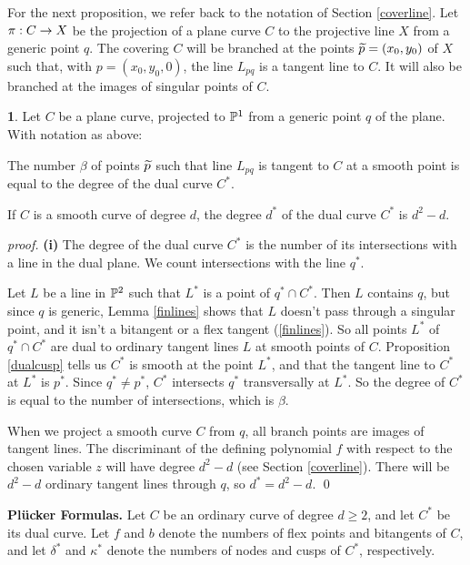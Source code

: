 \documentclass[leqno]{book}
\newcommand\Marginnote[1]{\marginnote{\hspace{-12pt}\normalfont{#1}}}
\theoremstyle{definition}%
\numberwithin{equation}{section}
\theoremstyle{theorem} %
\newtheorem{proposition}[equation]{}
\renewenvironment{proof}{\no \emph{proof.}}{}
\begin{document}
For the next proposition, we refer back to the notation of Section
\ref{coverline}.  Let $\pi: C \rightarrow X$ be the projection of a plane
curve $C$ to the projective line $X$ from a generic point $q$.  The
covering $C$ will be branched at the points $\widetilde p =
(x_0,y_0)$ of $X$ such that, with $p=(x_0,y_0,0)$, the line
$L_{pq}$ is a tangent line to $C$.  It will also be branched at the
images of singular points of $C$.

\begin{proposition}{} \Marginnote{classofcurve}
\label{classofcurve}  
Let $C$ be a plane curve, projected to $\mathbb{P}^1$ from a generic
point $q$ of the plane.   With notation as above:

 The number $\beta$ of points $\widetilde p$ such that line
$L_{pq}$ is tangent to $C$ at a smooth point is equal
to the degree of the dual curve $C^*$.


 If $C$ is a smooth curve of degree
$d$, the degree $d^*$ of the dual curve $C^*$ is $d^2-d$.
\end{proposition}

\begin{proof}  
{\bf (i)} The degree of the dual curve $C^*$ is the number of its
intersections with a line in the dual plane.  We count 
intersections with the line $q^*$.

Let $L$ be a line in $\mathbb{P}^2$ such
that $L^*$ is a point of $q^*\cap C^*$.  Then $L$ contains $q$, but
since $q$ is generic, Lemma \ref{finlines} shows that 
$L$ doesn't pass through a singular
point, and it isn't  a bitangent  or a  flex
tangent  (\ref{finlines}).  So  all points  $L^*$ of  $q^*\cap C^*$
are dual to ordinary tangent lines $L$ at smooth points of $C$.
Proposition \ref{dualcusp} tells us $C^*$ is
smooth at the point $L^*$, and that the tangent line to $C^*$ at $L^*$
is $p^*$.   Since $q^*\neq p^*$, $C^*$  intersects $q^*$ transversally
at $L^*$.   So the  degree of  $C^*$ is  equal to  the number  of 
intersections, which is $\beta$.

 When we project a smooth curve $C$ from $q$, all
branch points are images of tangent lines.  The discriminant of the
defining polynomial $f$ with respect to the chosen variable $z$ will
have degree $d^2-d$ (see Section \ref{coverline}).  There will be
$d^2-d$ ordinary tangent lines through $q$, so $d^* =
d^2-d$. \qed\end{proof}


\bsno
{\bf Pl\"ucker Formulas. } Let $C$ be
an ordinary  curve of degree $d \geq 2$, and let $C^*$ be its dual curve.  Let
$f$ and $b$ denote the numbers of flex points and bitangents of $C$,
and let $\delta^*$ and $\kappa^*$ denote the numbers of nodes and
cusps of $C^*$, respectively.
\end{document}
